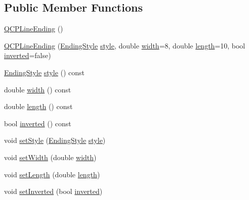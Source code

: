 \subsection*{Public Member Functions}
\begin{DoxyCompactItemize}
\item 
\hyperlink{class_q_c_p_line_ending_af2eaf8123b000d97fbd11929c669f61b}{Q\+C\+P\+Line\+Ending} ()
\item 
\hyperlink{class_q_c_p_line_ending_abb2abc7542f0c7a3c081d878248896a4}{Q\+C\+P\+Line\+Ending} (\hyperlink{class_q_c_p_line_ending_a5ef16e6876b4b74959c7261d8d4c2cd5}{Ending\+Style} \hyperlink{class_q_c_p_line_ending_aea324dbfddbca9895ca8a3a968671299}{style}, double \hyperlink{class_q_c_p_line_ending_a028328ee3fb139a40acaf65fb56edf67}{width}=8, double \hyperlink{class_q_c_p_line_ending_a1744315d7b73f6e7ead3621e2cb18c28}{length}=10, bool \hyperlink{class_q_c_p_line_ending_aa4ffbb182cbc89fc3d92eb348630502c}{inverted}=false)
\item 
\hyperlink{class_q_c_p_line_ending_a5ef16e6876b4b74959c7261d8d4c2cd5}{Ending\+Style} \hyperlink{class_q_c_p_line_ending_aea324dbfddbca9895ca8a3a968671299}{style} () const 
\item 
double \hyperlink{class_q_c_p_line_ending_a028328ee3fb139a40acaf65fb56edf67}{width} () const 
\item 
double \hyperlink{class_q_c_p_line_ending_a1744315d7b73f6e7ead3621e2cb18c28}{length} () const 
\item 
bool \hyperlink{class_q_c_p_line_ending_aa4ffbb182cbc89fc3d92eb348630502c}{inverted} () const 
\item 
void \hyperlink{class_q_c_p_line_ending_a56953b9cb8ed1bed0f025c3935f16910}{set\+Style} (\hyperlink{class_q_c_p_line_ending_a5ef16e6876b4b74959c7261d8d4c2cd5}{Ending\+Style} \hyperlink{class_q_c_p_line_ending_aea324dbfddbca9895ca8a3a968671299}{style})
\item 
void \hyperlink{class_q_c_p_line_ending_a26dc020ea985a72cc25881ce2115e34e}{set\+Width} (double \hyperlink{class_q_c_p_line_ending_a028328ee3fb139a40acaf65fb56edf67}{width})
\item 
void \hyperlink{class_q_c_p_line_ending_ae36fa01763751cd64b7f56c3507e935a}{set\+Length} (double \hyperlink{class_q_c_p_line_ending_a1744315d7b73f6e7ead3621e2cb18c28}{length})
\item 
void \hyperlink{class_q_c_p_line_ending_a580e4e2360b35ebb8d68f3494aa2335d}{set\+Inverted} (bool \hyperlink{class_q_c_p_line_ending_aa4ffbb182cbc89fc3d92eb348630502c}{inverted})
\item 

\end{DoxyCompactItemize}
